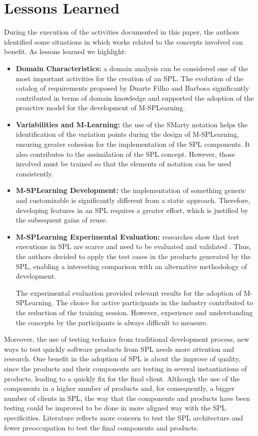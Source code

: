 \section{Lessons Learned}\label{section5}

During the execution of the activities documented in this paper, the authors identified some situations in which works related to the concepts involved can benefit. As lessons learned we highlight:

\begin{itemize}
    \item \textbf{Domain Characteristics:} a domain analysis can be considered one of the most important activities for the creation of an SPL. The evolution of the catalog of requirements proposed by Duarte Filho and Barbosa \cite{filho13} significantly contributed in terms of domain knowledge and supported the adoption of the proactive model for the development of M-SPLear\allowbreak ning.
    \item \textbf{Variabilities and M-Learning:} the use of the SMarty notation helps the identification of the variation points during the design of M-SPLear\allowbreak ning, ensuring greater cohesion for the implementation of the SPL components. It also contributes to the assimilation of the SPL concept. However, those involved must be trained so that the elements of notation can be used consistently.
    \item \textbf{M-SPLear\allowbreak ning Development:} the implementation of something generic and customizable is significantly different from a static approach. Therefore, developing features in an SPL requires a greater effort, which is justified by the subsequent gains of reuse.
    \item \textbf{M-SPLear\allowbreak ning Experimental Evaluation:} researches show that test executions in SPL are scarce and need to be evaluated and validated \cite{engstrom11}. Thus, the authors decided to apply the test cases in the products generated by the SPL, enabling a interesting comparison with an alternative methodology of development.
  
The experimental evaluation provided relevant results for the adoption of M-SPLear\allowbreak ning. The choice for active participants in the industry contributed to the reduction of the training session. However, experience and understanding the concepts by the participants is always difficult to measure.
\end{itemize}

Moreover, the use of testing technics from traditional development process, new ways to test quickly software products from SPL needs more attention and research. One benefit in the adoption of SPL is about the improve of quality, since the products and their components are testing in several instantiations of products, leading to a quickly fix for the final client. Although the use of the components in a higher number of products and, for consequently, a bigger number of clients in SPL, the way that the components and products have been testing could be improved to be done in more aligned way with the SPL specificities. Literature reflects more concern to test the SPL architecture and fewer preoccupation to test the final components and products.

